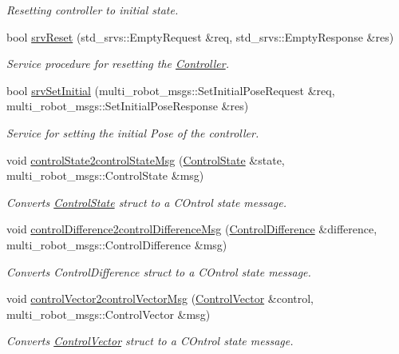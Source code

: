 \begin{DoxyCompactItemize}
\begin{DoxyCompactList}\small\item\em Resetting controller to initial state. \end{DoxyCompactList}\item 
bool \hyperlink{classController_a140aa1ee895337d776f88682640c0746}{srv\+Reset} (std\+\_\+srvs\+::\+Empty\+Request \&req, std\+\_\+srvs\+::\+Empty\+Response \&res)
\begin{DoxyCompactList}\small\item\em Service procedure for resetting the \hyperlink{classController}{Controller}. \end{DoxyCompactList}\item 
bool \hyperlink{classController_a2845a1e4b0c146206d4a03b757e82d5b}{srv\+Set\+Initial} (multi\+\_\+robot\+\_\+msgs\+::\+Set\+Initial\+Pose\+Request \&req, multi\+\_\+robot\+\_\+msgs\+::\+Set\+Initial\+Pose\+Response \&res)
\begin{DoxyCompactList}\small\item\em Service for setting the initial Pose of the controller. \end{DoxyCompactList}\item 
void \hyperlink{classController_a753fe3680abc7c9ba3040f6fcb638ac2}{control\+State2control\+State\+Msg} (\hyperlink{structController_1_1ControlState}{Control\+State} \&state, multi\+\_\+robot\+\_\+msgs\+::\+Control\+State \&msg)
\begin{DoxyCompactList}\small\item\em Converts \hyperlink{structController_1_1ControlState}{Control\+State} struct to a C\+Ontrol state message. \end{DoxyCompactList}\item 
void \hyperlink{classController_a866cee7328e1318e118c884a850a0e34}{control\+Difference2control\+Difference\+Msg} (\hyperlink{classController_a75a1e2f93842f65d1263f7d3c2fd8898}{Control\+Difference} \&difference, multi\+\_\+robot\+\_\+msgs\+::\+Control\+Difference \&msg)
\begin{DoxyCompactList}\small\item\em Converts Control\+Difference struct to a C\+Ontrol state message. \end{DoxyCompactList}\item 
void \hyperlink{classController_a06c1aab700c5918b76e33c35f3da8ea8}{control\+Vector2control\+Vector\+Msg} (\hyperlink{structController_1_1ControlVector}{Control\+Vector} \&control, multi\+\_\+robot\+\_\+msgs\+::\+Control\+Vector \&msg)
\begin{DoxyCompactList}\small\item\em Converts \hyperlink{structController_1_1ControlVector}{Control\+Vector} struct to a C\+Ontrol state message. \end{DoxyCompactList}\end{DoxyCompactItemize}
